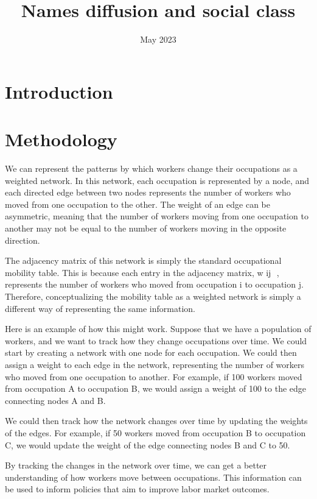 \documentclass{article}
\title{Names diffusion and social class}
\author{}
\date{May 2023}
\begin{document}
\maketitle

\section{Introduction}

\section{Methodology}

We can represent the patterns by which workers change their occupations as a weighted network. In this network, each occupation is represented by a node, and each directed edge between two nodes represents the number of workers who moved from one occupation to the other. The weight of an edge can be asymmetric, meaning that the number of workers moving from one occupation to another may not be equal to the number of workers moving in the opposite direction.

The adjacency matrix of this network is simply the standard occupational mobility table. This is because each entry in the adjacency matrix, w 
ij
​
 , represents the number of workers who moved from occupation i to occupation j. Therefore, conceptualizing the mobility table as a weighted network is simply a different way of representing the same information.

Here is an example of how this might work. Suppose that we have a population of workers, and we want to track how they change occupations over time. We could start by creating a network with one node for each occupation. We could then assign a weight to each edge in the network, representing the number of workers who moved from one occupation to another. For example, if 100 workers moved from occupation A to occupation B, we would assign a weight of 100 to the edge connecting nodes A and B.

We could then track how the network changes over time by updating the weights of the edges. For example, if 50 workers moved from occupation B to occupation C, we would update the weight of the edge connecting nodes B and C to 50.

By tracking the changes in the network over time, we can get a better understanding of how workers move between occupations. This information can be used to inform policies that aim to improve labor market outcomes.
\end{document}
